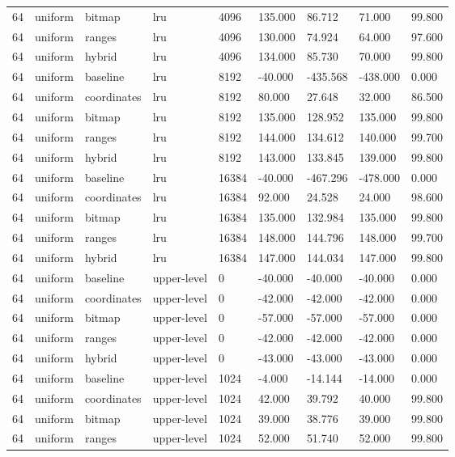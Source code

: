 \begin{tabular}{lllllllll}
64 & uniform & bitmap & lru & 4096 & 135.000 & 86.712 & 71.000 & 99.800 \\
64 & uniform & ranges & lru & 4096 & 130.000 & 74.924 & 64.000 & 97.600 \\
64 & uniform & hybrid & lru & 4096 & 134.000 & 85.730 & 70.000 & 99.800 \\
64 & uniform & baseline & lru & 8192 & -40.000 & -435.568 & -438.000 & 0.000 \\
64 & uniform & coordinates & lru & 8192 & 80.000 & 27.648 & 32.000 & 86.500 \\
64 & uniform & bitmap & lru & 8192 & 135.000 & 128.952 & 135.000 & 99.800 \\
64 & uniform & ranges & lru & 8192 & 144.000 & 134.612 & 140.000 & 99.700 \\
64 & uniform & hybrid & lru & 8192 & 143.000 & 133.845 & 139.000 & 99.800 \\
64 & uniform & baseline & lru & 16384 & -40.000 & -467.296 & -478.000 & 0.000 \\
64 & uniform & coordinates & lru & 16384 & 92.000 & 24.528 & 24.000 & 98.600 \\
64 & uniform & bitmap & lru & 16384 & 135.000 & 132.984 & 135.000 & 99.800 \\
64 & uniform & ranges & lru & 16384 & 148.000 & 144.796 & 148.000 & 99.700 \\
64 & uniform & hybrid & lru & 16384 & 147.000 & 144.034 & 147.000 & 99.800 \\
64 & uniform & baseline & upper-level & 0 & -40.000 & -40.000 & -40.000 & 0.000 \\
64 & uniform & coordinates & upper-level & 0 & -42.000 & -42.000 & -42.000 & 0.000 \\
64 & uniform & bitmap & upper-level & 0 & -57.000 & -57.000 & -57.000 & 0.000 \\
64 & uniform & ranges & upper-level & 0 & -42.000 & -42.000 & -42.000 & 0.000 \\
64 & uniform & hybrid & upper-level & 0 & -43.000 & -43.000 & -43.000 & 0.000 \\
64 & uniform & baseline & upper-level & 1024 & -4.000 & -14.144 & -14.000 & 0.000 \\
64 & uniform & coordinates & upper-level & 1024 & 42.000 & 39.792 & 40.000 & 99.800 \\
64 & uniform & bitmap & upper-level & 1024 & 39.000 & 38.776 & 39.000 & 99.800 \\
64 & uniform & ranges & upper-level & 1024 & 52.000 & 51.740 & 52.000 & 99.800 \\

\end{tabular}
